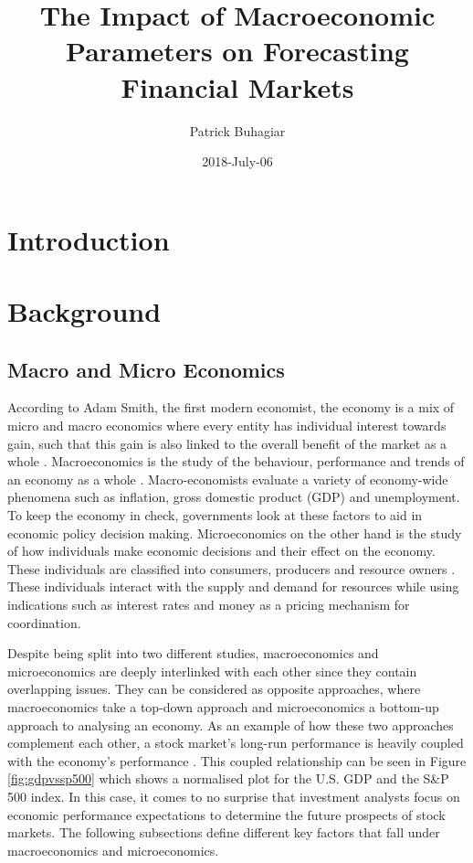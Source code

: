 \documentclass{UoYCSproject}
\author{Patrick Buhagiar}
\title{The Impact of Macroeconomic Parameters on Forecasting Financial Markets}
\date{2018-July-06}
\begin{document}
\maketitle

\listoffigures
\listoftables

\label{sec:start}
\thispagestyle{empty}\cleardoublepage

\chapter{Introduction}
\label{cha:introduction}



\chapter{Background}
\label{cha:background}

\section{Macro and Micro Economics}
According to Adam Smith, the first modern economist, the economy is a mix of micro and macro economics where every entity has individual interest towards gain, such that this gain is also linked to the overall benefit of the market as a whole \cite{smith1950inquiry}. Macroeconomics is the study of the behaviour, performance and trends of an economy as a whole \cite{2003economics}. Macro-economists evaluate a variety of economy-wide phenomena such as inflation, gross domestic product (GDP) and unemployment. To keep the economy in check, governments look at these factors to aid in economic policy decision making. Microeconomics on the other hand is the study of how individuals make economic decisions and their effect on the economy. These individuals are classified into consumers, producers and resource owners \cite{dwivedi2002microeconomics}. These individuals interact with the supply and demand for resources while using indications such as interest rates and money as a pricing mechanism for coordination. 

Despite being split into two different studies, macroeconomics and microeconomics are deeply interlinked with each other since they contain overlapping issues. They can be considered as opposite approaches, where macroeconomics take a top-down approach and microeconomics a bottom-up approach to analysing an economy. As an example of how these two approaches complement each other, a stock market's long-run performance is heavily coupled with the economy's performance \cite{davis2008macroeconomic}. This coupled relationship can be seen in Figure \ref{fig:gdpvssp500} which shows a normalised plot for the U.S. GDP and the S\&P 500 index. In this case, it comes to no surprise that investment analysts focus on economic performance expectations to determine the future prospects of stock markets. The following subsections define different key factors that fall under macroeconomics and microeconomics.
\end{document}

